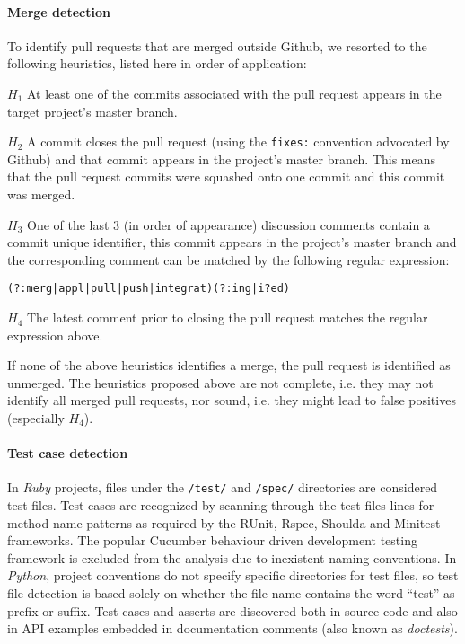 \documentclass{sig-alternate}
\begin{document}


\paragraph*{Merge detection}
To identify pull requests that are merged outside Github, we resorted to
the following heuristics, listed here in order of application:

\begin{compactdesc}

  \item[$H_1$] At least one of the commits associated with the pull request appears in the target project's master branch.

  \item[$H_2$] A commit closes the pull request (using the \texttt{fixes:}
    convention advocated by Github) and that commit appears in the project's
    master branch.  This means that the pull request commits were squashed onto
    one commit and this commit was merged.

  \item[$H_3$] One of the last 3 (in order of appearance) discussion comments
    contain a commit unique identifier, this commit appears in the project's
    master branch and the corresponding comment can be matched by the following
    regular expression:

    \begin{small}
    \texttt{(?:merg|appl|pull|push|integrat)(?:ing|i?ed)}
    \end{small}

  \item[$H_4$] The latest comment prior to closing the pull request matches the
    regular expression above.

\end{compactdesc}

If none of the above heuristics identifies a merge, the pull request is
identified as unmerged. The heuristics proposed above are not complete, i.e. they may not identify all merged pull requests, nor sound, i.e. they might lead to false positives (especially $H_4$).

\paragraph*{Test case detection}
In \emph{Ruby} projects, files under the \texttt{/test/} and \texttt{/spec/}
directories are considered test files. Test cases are recognized by scanning
through the test files lines for method name patterns as required by the
\textsf{RUnit}, \textsf{Rspec}, \textsf{Shoulda} and \textsf{Minitest}
frameworks. The popular Cucumber behaviour driven development testing framework
is excluded from the analysis due to inexistent naming conventions.  In
\emph{Python}, project conventions do not specify specific directories for test
files, so test file detection is based solely on whether the file name contains
the word ``test'' as prefix or suffix. Test cases and asserts are discovered
both in source code and also in API examples embedded in documentation comments
(also known as \emph{doctests}).
\end{document}
